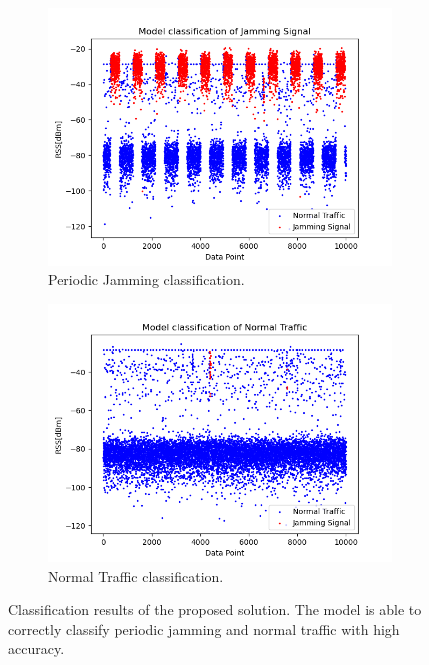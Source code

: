 \documentclass[futureinternet,article,submit,pdftex,moreauthors]{Definitions/mdpi}
\begin{document}
\begin{figure}[H]
	\centering
	\begin{subfigure}{0.49\textwidth}
		\centering
		\includegraphics[width=\textwidth]{img/OnlyPeriodicJamming.png}
		\caption{Periodic Jamming classification.}
		\label{fig:periodicJammingClassification}
	\end{subfigure}
	\hfill
	\begin{subfigure}{0.49\textwidth}
		\centering
		\includegraphics[width=\textwidth]{img/OnlyNormalTraffic.png}
		\caption{Normal Traffic classification.}
		\label{fig:normalTrafficClassification}
	\end{subfigure}
	\caption{Classification results of the proposed solution. The model is able to correctly classify periodic jamming and normal traffic with high accuracy.}
	\label{fig:proposedSolutionClassification}
\end{figure}
\end{document}
